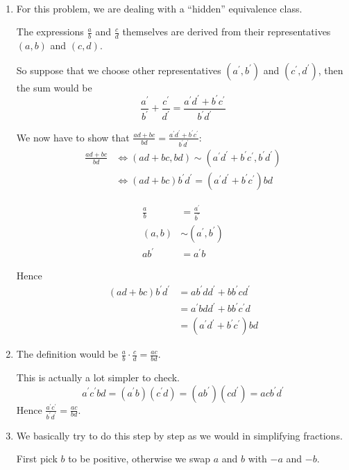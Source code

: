 \begin{solution} \ 
\begin{enumerate}[label=(\alph*)]
\item For this problem, we are dealing with a ``hidden'' equivalence class.

The expressions $\frac{a}{b}$ and $\frac{c}{d}$ themselves are derived from their representatives $(a,b)$ and $(c,d)$.

So suppose that we choose other representatives $(a^\prime,b^\prime)$ and $(c^\prime,d^\prime)$, then the sum would be
\[ \frac{a^\prime}{b^\prime} + \frac{c^\prime}{d^\prime} = \frac{a^\prime d^\prime + b^\prime c^\prime}{b^\prime d^\prime} \]

We now have to show that $\frac{ad+bc}{bd} = \frac{a^\prime d^\prime + b^\prime c^\prime}{b^\prime d^\prime}$:
\begin{align*}
\frac{ad+bc}{bd} 
&\iff (ad+bc,bd) \sim (a^\prime d^\prime+b^\prime c^\prime,b^\prime d^\prime) \\
&\iff (ad+bc)b^\prime d^\prime =(a^\prime d^\prime+b^\prime c^\prime)bd
\end{align*}

\begin{align*}
\frac{a}{b} &= \frac{a^\prime}{b^\prime} \\
(a,b) &\sim (a^\prime,b^\prime) \\
ab^\prime &= a^\prime b
\end{align*}

Hence
\begin{align*}
(ad+bc)b^\prime d^\prime
&= ab^\prime dd^\prime + bb^\prime cd^\prime \\
&= a^\prime bdd^\prime + bb^\prime c^\prime d \\
&= (a^\prime d^\prime + b^\prime c^\prime )bd
\end{align*}

\item The definition would be $\frac{a}{b} \cdot \frac{c}{d} = \frac{ac}{bd}$.

This is actually a lot simpler to check.
\[ a^\prime c^\prime bd=(a^\prime b)(c^\prime d)=(ab^\prime)(cd^\prime)=acb^\prime d^\prime \]
Hence $\frac{a^\prime c^\prime}{b^\prime d^\prime} = \frac{ac}{bd}$.

\item We basically try to do this step by step as we would in simplifying fractions.

First pick $b$ to be positive, otherwise we swap $a$ and $b$ with $-a$ and $-b$.


\end{enumerate}
\end{solution}
